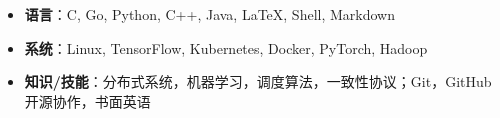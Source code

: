 
  \begin{itemize}[leftmargin=*]
    \item \textbf{语言}：C, Go, Python, C++, Java, \LaTeX, Shell, Markdown
    \item \textbf{系统}：Linux, TensorFlow, Kubernetes, Docker, PyTorch, Hadoop
    \item \textbf{知识/技能}：分布式系统，机器学习，调度算法，一致性协议；Git，GitHub开源协作，书面英语
  \end{itemize}